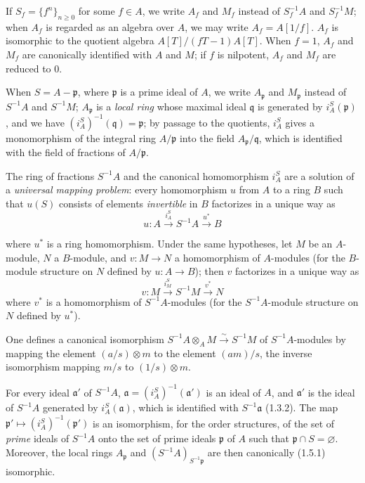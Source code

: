 \begin{env}[1.2.3]
\label{0.1.2.3}
If $S_f=\{f^n\}_{n\geq 0}$ for some $f\in A$, we write $A_f$ and $M_f$ instead of $S_f^{-1}A$ and $S_f^{-1}M$; when $A_f$ is regarded as an algebra over $A$, we may write $A_f=A[1/f]$.
$A_f$ is isomorphic to the quotient algebra $A[T]/(fT-1)A[T]$.
When $f=1$, $A_f$ and $M_f$ are canonically identified with $A$ and $M$; if $f$ is nilpotent, $A_f$ and $M_f$ are reduced to $0$.

When $S=A-\mathfrak{p}$, where $\mathfrak{p}$ is a prime ideal of $A$, we write $A_{\mathfrak{p}}$ and $M_{\mathfrak{p}}$ instead of $S^{-1}A$ and $S^{-1}M$; $A_{\mathfrak{p}}$ is a \emph{local ring} whose maximal ideal $\mathfrak{q}$ is generated by $i_A^S(\mathfrak{p})$, and we have $(i_A^S)^{-1}(\mathfrak{q})=\mathfrak{p}$; by passage to the quotients, $i_A^S$ gives a monomorphism of the integral ring $A/\mathfrak{p}$ into the field $A_{\mathfrak{p}}/\mathfrak{q}$, which is identified with the field of fractions of $A/\mathfrak{p}$.
\end{env}

\begin{env}[1.2.4]
\label{0.1.2.4}
The ring of fractions $S^{-1}A$ and the canonical homomorphism $i_A^S$ are a solution of a \emph{universal mapping problem}: every homomorphism $u$ from $A$ to a ring $B$ such that $u(S)$ consists of elements \emph{invertible} in $B$ factorizes in a unique way as
\[
  u:A\xrightarrow{i_A^S}S^{-1}A\xrightarrow{u^*}B
\]

where $u^*$ is a ring homomorphism.
Under the same hypotheses, let $M$ be an $A$-module, $N$ a $B$-module, and $v:M\to N$ a homomorphism of $A$-modules (for the $B$-module structure on $N$ defined by $u:A\to B$); then $v$ factorizes in a unique way as
\[
  v:M\xrightarrow{i_M^S}S^{-1}M\xrightarrow{v^*}N
\]
where $v^*$ is a homomorphism of $S^{-1}A$-modules (for the $S^{-1}A$-module structure on $N$ defined by $u^*$).
\end{env}

\begin{env}[1.2.5]
\label{0.1.2.5}
One defines a canonical isomorphism $S^{-1}A\otimes_A M\xrightarrow{\sim}S^{-1}M$ of $S^{-1}A$-modules by mapping the element $(a/s)\otimes m$ to the element $(am)/s$, the inverse isomorphism mapping $m/s$ to $(1/s)\otimes m$.
\end{env}

\begin{env}[1.2.6]
\label{0.1.2.6}
For every ideal $\mathfrak{a}'$ of $S^{-1}A$, $\mathfrak{a}=(i_A^S)^{-1}(\mathfrak{a}')$ is an ideal of $A$, and $\mathfrak{a}'$ is the ideal of $S^{-1}A$ generated by $i_A^S(\mathfrak{a})$, which is identified with $S^{-1}\mathfrak{a}$ (1.3.2).
The map $\mathfrak{p}'\mapsto(i_A^S)^{-1}(\mathfrak{p}')$ is an isomorphism, for the order structures, of the set of \emph{prime} ideals of $S^{-1}A$ onto the set of prime ideals $\mathfrak{p}$ of $A$ such that $\mathfrak{p}\cap S=\varnothing$.
Moreover, the local rings $A_{\mathfrak{p}}$ and $(S^{-1}A)_{S^{-1}\mathfrak{p}}$ are then canonically (1.5.1) isomorphic.
\end{env}

